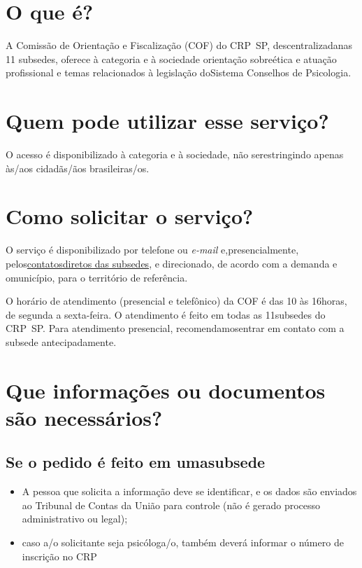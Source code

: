 \section{O que é?}

A Comissão de Orientação e Fiscalização (COF) do CRP~SP, descentralizadanas 11 subsedes, oferece à categoria e à sociedade orientação sobreética e atuação profissional e temas relacionados à legislação doSistema Conselhos de Psicologia.

\section{Quem pode utilizar esse serviço?}

O acesso é disponibilizado à categoria e à sociedade, não serestringindo apenas às/aos cidadãs/ãos brasileiras/os.

\section{Como solicitar o serviço?}

O serviço é disponibilizado por telefone ou \emph{e-mail} e,presencialmente, pelos\href{http://www.crpsp.org/noticia/view/2460/contatos-das-subsedes-do-crp-sp}{contatosdiretos das subsedes}, e direcionado, de acordo com a demanda e omunicípio, para o território de referência.

O horário de atendimento (presencial e telefônico) da COF é das 10 às 16horas, de segunda a sexta-feira. O atendimento é feito em todas as 11subsedes do CRP~SP. Para atendimento presencial, recomendamosentrar em contato com a subsede antecipadamente.

\section{Que informações ou documentos são necessários?}

\subsection{Se o pedido é feito em umasubsede}

\begin{itemize}
  \item  A pessoa que solicita a informação deve se identificar, e os dados são  enviados ao Tribunal de Contas da União para controle (não é gerado  processo administrativo ou legal);
  \item  caso a/o solicitante seja psicóloga/o, também deverá informar o número  de inscrição no CRP
\end{itemize}

